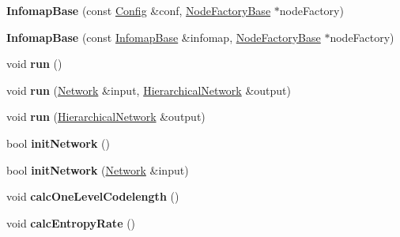 \begin{DoxyCompactItemize}
\item 
\mbox{\label{classInfomapBase_ad70ef13ee923d11822c706c99e3acad1}} 
{\bfseries Infomap\+Base} (const \mbox{\hyperlink{structConfig}{Config}} \&conf, \mbox{\hyperlink{classNodeFactoryBase}{Node\+Factory\+Base}} $\ast$node\+Factory)
\item 
\mbox{\label{classInfomapBase_af0d03cda09e95c018f5471f83bedb395}} 
{\bfseries Infomap\+Base} (const \mbox{\hyperlink{classInfomapBase}{Infomap\+Base}} \&infomap, \mbox{\hyperlink{classNodeFactoryBase}{Node\+Factory\+Base}} $\ast$node\+Factory)
\item 
\mbox{\label{classInfomapBase_a8b8bf35f42a03f3abf797b6a06ce9873}} 
void {\bfseries run} ()
\item 
\mbox{\label{classInfomapBase_a3fae64f1a942f8efe41d7e40696b3d1d}} 
void {\bfseries run} (\mbox{\hyperlink{classNetwork}{Network}} \&input, \mbox{\hyperlink{classHierarchicalNetwork}{Hierarchical\+Network}} \&output)
\item 
\mbox{\label{classInfomapBase_a1865023eecb098ba1ba9d00164851d64}} 
void {\bfseries run} (\mbox{\hyperlink{classHierarchicalNetwork}{Hierarchical\+Network}} \&output)
\item 
\mbox{\label{classInfomapBase_a7c35382d0b4dc02e875f43174b20541b}} 
bool {\bfseries init\+Network} ()
\item 
\mbox{\label{classInfomapBase_a795d05d87685a4711eb528e3947c16f4}} 
bool {\bfseries init\+Network} (\mbox{\hyperlink{classNetwork}{Network}} \&input)
\item 
\mbox{\label{classInfomapBase_ad808b0cf6c10cad542b5dcead997c147}} 
void {\bfseries calc\+One\+Level\+Codelength} ()
\item 
\mbox{\label{classInfomapBase_af44c571136811f49c2d3c1fb2401983f}} 
void {\bfseries calc\+Entropy\+Rate} ()
\item 
\mbox{\label{classInfomapBase_a580c1b1174a1093489faf6cfefaf0eb2}} 

\end{DoxyCompactItemize}
